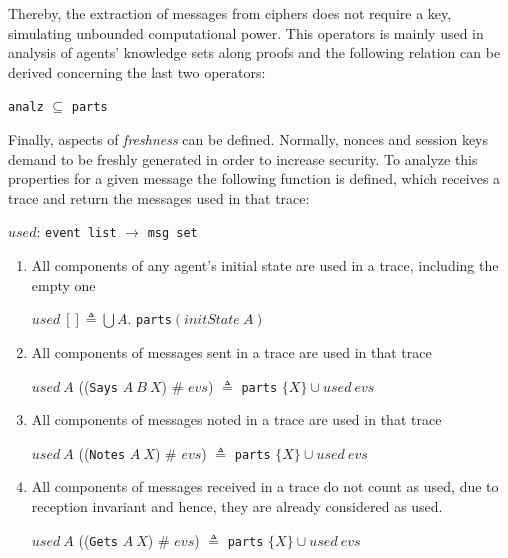 Thereby, the extraction of messages from ciphers does not require a key, simulating unbounded computational power. This operators is mainly used in analysis of agents' knowledge sets along proofs and the following relation can be derived concerning the last two operators:

\begin{center}
  \texttt{analz} \(\subseteq \) \texttt{parts}
\end{center}

Finally, aspects of \textit{freshness} can be defined. Normally, nonces and session keys demand to be freshly generated in order to increase security. To analyze this properties for a given message the following function is defined, which receives a trace and return the messages used in that trace:

\begin{center}
  \(used\): \texttt{event list} \(\longrightarrow \) \texttt{msg set}
\end{center}

\begin{enumerate}
  \item All components of any agent's initial state are used in a trace, including the empty one
  \begin{center}
    \(used\ [] \triangleq \bigcup A\). \texttt{parts}\( (initState\ A)\)
  \end{center}
  \item All components of messages sent in a trace are used in that trace
  \begin{center}
    \(used\ A\) ((\texttt{Says} \(A\ B\ X\)) \# \(evs\)) \(\triangleq \) \texttt{parts} \( \{X\} \cup used\ evs\)
  \end{center}
  \item All components of messages noted in a trace are used in that trace
  \begin{center}
    \(used\ A\) ((\texttt{Notes} \(A\ X\)) \# \(evs\)) \(\triangleq \) \texttt{parts} \( \{X\} \cup used\ evs\)
  \end{center}
  \item All components of messages received in a trace do not count as used, due to reception invariant and hence, they are already considered as used.
  \begin{center}
    \(used\ A\) ((\texttt{Gets} \(A\ X\)) \# \(evs\)) \(\triangleq \) \texttt{parts} \( \{X\} \cup used\ evs\)
  \end{center}
\end{enumerate}



